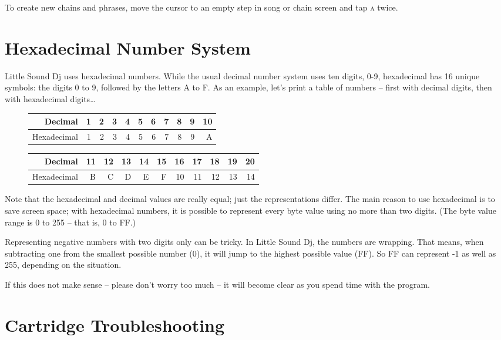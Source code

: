 To create new chains and phrases, move the cursor to an empty step in song or chain screen and tap \textsc{a} twice.

\section{Hexadecimal Number System}

Little Sound Dj uses hexadecimal numbers. While the usual decimal number system uses ten digits, 0-9, hexadecimal has 16 unique symbols: the digits 0 to 9, followed by the letters A to F.
As an example, let's print a table of numbers -- first with decimal digits, then with
hexadecimal digits\ldots

\begin{figure}[hbtp]
\centering

\begin{tabular}{r|r|r|r|r|r|r|r|r|r|r}
 Decimal & 1 & 2 & 3 & 4 & 5 & 6 & 7 & 8 & 9 & 10 \\
\hline
 Hexadecimal & 1 & 2 & 3 & 4 & 5 & 6 & 7 & 8 & 9 & A \\
\end{tabular}

\begin{tabular}{r|r|r|r|r|r|r|r|r|r|r}
 Decimal & 11 & 12 & 13 & 14 & 15 & 16 & 17 & 18 & 19 & 20 \\
\hline
 Hexadecimal & B & C & D & E & F & 10 & 11 & 12 & 13 & 14  \\
\end{tabular}

\end{figure}

Note that the hexadecimal and decimal values are really equal; just the representations differ.
The main reason to use hexadecimal is to save screen space; with hexadecimal
numbers, it is possible to represent every byte value using no more than two digits. (The
byte value range is 0 to 255 -- that is, 0 to FF.)

Representing negative numbers with two digits only can be tricky. In Little Sound Dj,
the numbers are wrapping. That means, when subtracting one from the smallest possible
number (0), it will jump to the highest possible value (FF). So FF can represent -1 as well as 255, depending on the situation.

If this does not make sense -- please don't worry too much -- it will become clear as you spend time with the program.

\section{Cartridge Troubleshooting}


